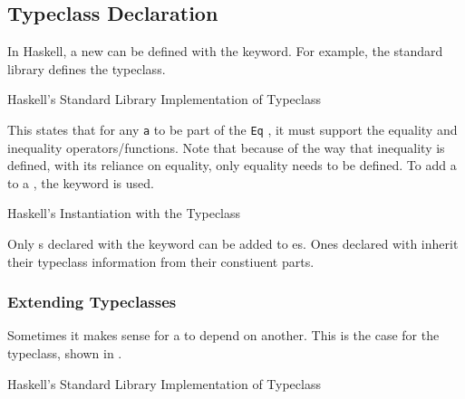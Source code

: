 \subsection{Typeclass Declaration}\label{subsec:Typeclass_Declaration}
In Haskell, a new  can be defined with the  keyword.
For example, the standard library defines the  typeclass.

\begin{listing}[h!tbp]
\caption{Haskell's Standard Library Implementation of  Typeclass}
\label{lst:Eq_Typeclass_Definition}
\end{listing}

This states that for any  \texttt{a} to be part of the \texttt{Eq} , it must support the equality and inequality operators/functions.
Note that because of the way that inequality is defined, with its reliance on equality, only equality needs to be defined.
To add a  to a , the  keyword is used.

\begin{listing}[h!tbp]
\caption{Haskell's  Instantiation with the  Typeclass}
\label{lst:Eq_Typeclass_Instance}
\end{listing}

Only s declared with the  keyword can be added to es.
Ones declared with  inherit their typeclass information from their constiuent parts.

\subsubsection{Extending Typeclasses}\label{subsubsec:Extending_Typeclasses}
Sometimes it makes sense for a  to depend on another.
This is the case for the  typeclass, shown in .

\begin{listing}[h!tbp]
\caption{Haskell's Standard Library Implementation of  Typeclass}
\label{lst:Ord_Typeclass_Definition}
\end{listing}

